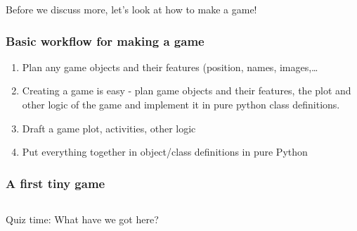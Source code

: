 \documentclass[aspectratio=43]{beamer}
\begin{document}
 \begin{frame}
  \Large
  Before we discuss more, let's look at how to make a game!
 \end{frame}


 \begin{frame}
  \frametitle{Basic workflow for making a game}

  \begin{enumerate}
   \item{Plan any game objects and their features (position, names, images,…}
   \item{Creating a game is easy - plan game objects and their features, the plot and other logic of the game and implement it in pure python class 
         definitions.}
   \item{Draft a game plot, activities, other logic}
   \item{Put everything together in object/class definitions in pure Python}
  \end{enumerate}
 \end{frame}


 \begin{frame}
  \frametitle{A first tiny game}

  {
   \inputminted[linenos,breaklines]{python}{ex_schoolkid.py}
  }
 \end{frame}


 \begin{frame}
  \Large
  Quiz time: What have we got here?
 \end{frame}
\end{document}
